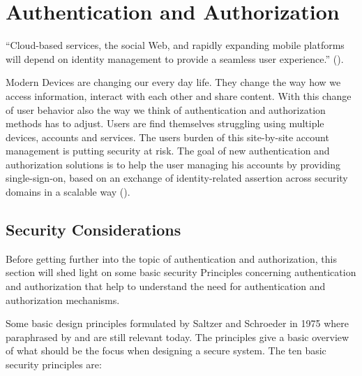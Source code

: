\chapter{Authentication and Authorization}\label{chap:authenticationandauthorization}

\chapterstart

“Cloud-based services, the social Web, and rapidly expanding mobile platforms will depend on identity management to provide a seamless user experience.”   (\citet{Corre:2017:WHI}).

Modern Devices are changing our every day life. They change the way how we access information, interact with each other and share content. 
With this change of user behavior also the way we think of authentication and authorization methods has to adjust. Users are find themselves struggling using multiple devices, accounts and services. The users burden of this site-by-site account management is putting security at risk. The goal of new authentication and authorization solutions is to help the user managing his accounts by providing single-sign-on, based on an exchange of identity-related assertion across security domains in a scalable way (\citet{Corre:2017:WHI}).  

\section{Security Considerations}

Before getting further into the topic of authentication and authorization, this section will shed light on some basic security Principles concerning authentication and authorization that help to understand the need for authentication and authorization mechanisms. 


Some basic design principles formulated by Saltzer and Schroeder in 1975 where paraphrased by \cite{Neumann:2018:PTC} and are still relevant today. The principles give a basic overview of what should be the focus when designing a secure system. The ten basic security principles are:

